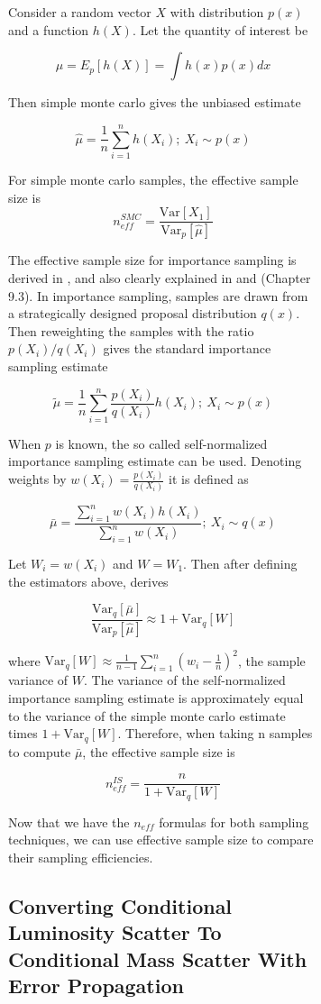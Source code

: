 \documentclass[\docopts]{\docclass}
\begin{document}
\begin{figure}[h!]
\begin{figure}[h!]
Consider a random vector $X$ with distribution $p(x)$ and a function $h(X)$. 
Let the quantity of interest be

$$\mu = E_p[h(X)] = \int h(x)p(x)dx$$

\noindent Then simple monte carlo gives the unbiased estimate 

$$\hat{\mu} = \frac{1}{n}\sum_{i=1}^n h(X_i);\ X_i \sim p(x)$$ 

\noindent For simple monte carlo samples, the effective sample size is $$n_{eff}^{SMC} = \frac{\text{Var}[X_1]}{\text{Var}_p[\hat{\mu}]}$$

The effective sample size for importance sampling is derived in \citealt{ess}, and also clearly explained in \citealt{ess2} and \citealt{mcbook} (Chapter 9.3). 
In importance sampling, samples are drawn from a strategically designed proposal distribution $q(x)$. 
Then reweighting the samples with the ratio $p(X_i)/q(X_i)$ gives the standard importance sampling estimate

$$\tilde{\mu} = \frac{1}{n} \sum_{i=1}^n \frac{p(X_i)}{q(X_i)} h(X_i);\ X_i \sim p(x)$$

\noindent When $p$ is known, the so called self-normalized importance sampling estimate can be used. Denoting weights by $w(X_i) = \frac{p(X_i)}{q(X_i)}$ it is defined as

$$\bar{\mu} = \frac{\sum_{i=1}^n w(X_i)h(X_i)}{\sum_{i=1}^n w(X_i)};\ X_i \sim q(x)$$

\noindent Let $W_i = w(X_i)$ and $W=W_1$. Then after defining the estimators above, \citealt{ess} derives

$$ \frac{\text{Var}_q[\bar{\mu}]}{\text{Var}_p[\hat{\mu}]} \approx 1 + \text{Var}_q[W]$$

\noindent where $\text{Var}_q[W] \approx \frac{1}{n-1}\sum_{i=1}^n (w_i - \frac{1}{n})^2$, the sample variance of $W$. The variance of the self-normalized importance sampling estimate is approximately equal to the variance of the simple monte carlo estimate times $1 + \text{Var}_q[W]$. Therefore, when taking n samples to compute $\bar{\mu}$, the effective sample size is

$$n_{eff}^{IS} = \frac{n}{1 + \text{Var}_q[W]}$$

\noindent Now that we have the $n_{eff}$ formulas for both sampling techniques, we can use effective sample size to compare their sampling efficiencies.

\newpage

\subsection{Converting Conditional Luminosity Scatter To Conditional Mass Scatter With Error Propagation}
\label{subsec:error_prop}


\end{figure}
\end{figure}
\end{document}
